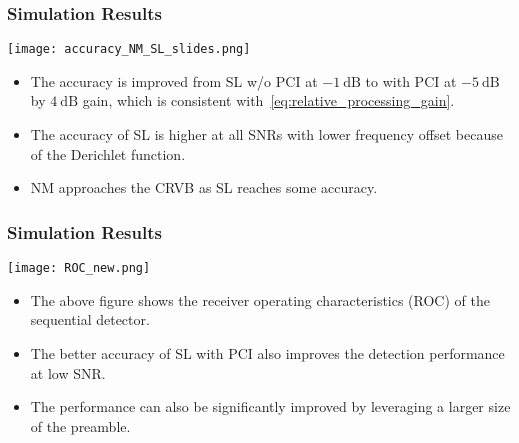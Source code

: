 \begin{frame}
  \frametitle{Simulation Results}

    \begin{center}
      \texttt{[image: accuracy\_NM\_SL\_slides.png]}
    \end{center}

    \begin{itemize}
    
      \item The accuracy is improved from SL w/o PCI at $\SI{-1}{\dB}$ to with PCI at $\SI{-5}{\dB}$ by $\SI{4}{\dB}$ gain, which is consistent with~\eqref{eq:relative_processing_gain}.
      \item The accuracy of SL is higher at all SNRs with lower frequency offset because of the Derichlet function.  
      \item NM approaches the CRVB as SL reaches some accuracy.

    \end{itemize}




\end{frame}

\begin{frame}
  \frametitle{Simulation Results}

    \begin{center}
      \texttt{[image: ROC\_new.png]}
    \end{center}

    \begin{itemize}
    
      \item The above figure shows the receiver operating characteristics (ROC) of the sequential detector.
      \item The better accuracy of SL with PCI also improves the detection performance at low SNR.
      \item The performance can also be significantly improved by leveraging a larger size of the preamble.

    \end{itemize}

\end{frame}